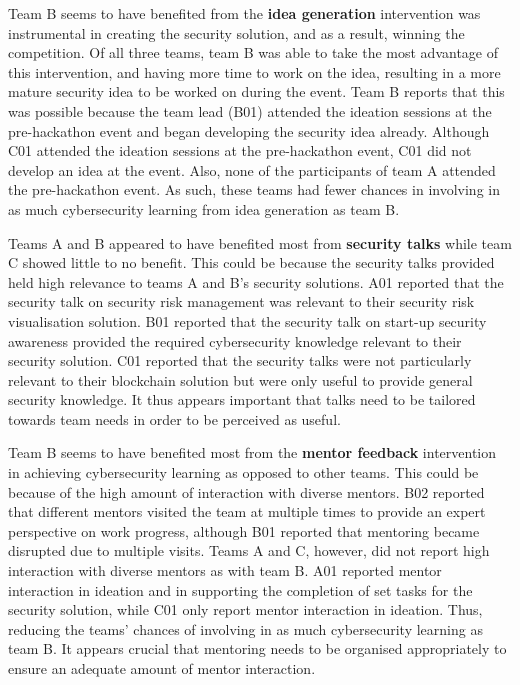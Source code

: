 \documentclass[runningheads]{llncs}
\begin{document}
Team B seems to have benefited from the \textbf{idea generation} intervention was instrumental in creating the security solution, and as a result, winning the competition. Of all three teams, team B was able to take the most advantage of this intervention, and having more time to work on the idea, resulting in a more mature security idea to be worked on during the event. Team B reports that this was possible because the team lead (B01) attended the ideation sessions at the pre-hackathon event and began developing the security idea already.
Although C01 attended the ideation sessions at the pre-hackathon event, C01 did not develop an idea at the event. Also, none of the participants of team A attended the pre-hackathon event.
As such, these teams had fewer chances in involving in as much cybersecurity learning from idea generation as team B.

Teams A and B appeared to have benefited most from \textbf{security talks} while team C showed little to no benefit. This could be because the security talks provided held high relevance to teams A and B's security solutions. 
A01 reported that the security talk on security risk management was relevant to their security risk visualisation solution. B01 reported that the security talk on start-up security awareness provided the required cybersecurity knowledge relevant to their security solution.
C01 reported that the security talks were not particularly relevant to their blockchain solution but were only useful to provide general security knowledge. It thus appears important that talks need to be tailored towards team needs in order to be perceived as useful.

Team B seems to have benefited most from the \textbf{mentor feedback} intervention in achieving cybersecurity learning as opposed to other teams. This could be because of the high amount of interaction with diverse mentors. B02 reported that different mentors visited the team at multiple times to provide an expert perspective on work progress, although B01 reported that mentoring became disrupted due to multiple visits.
Teams A and C, however, did not report high interaction with diverse mentors as with team B. 
A01 reported mentor interaction in ideation and in supporting the completion of set tasks for the security solution, while C01 only report mentor interaction in ideation. Thus, reducing the teams' chances of involving in as much cybersecurity learning as team B. 
It appears crucial that mentoring needs to be organised appropriately to ensure an adequate amount of mentor interaction.
\end{document}
